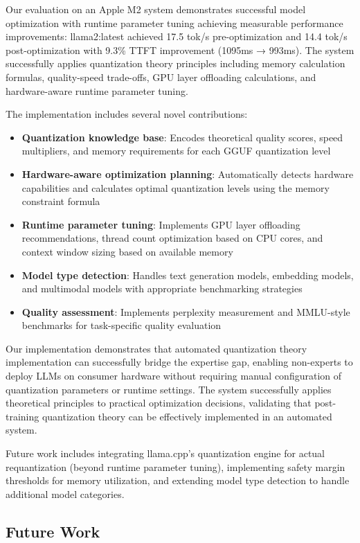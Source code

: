 \documentclass[journal]{IEEEtran}
\begin{document}
Our evaluation on an Apple M2 system demonstrates successful model optimization with runtime parameter tuning achieving measurable performance improvements: llama2:latest achieved 17.5 tok/s pre-optimization and 14.4 tok/s post-optimization with 9.3\% TTFT improvement (1095ms → 993ms). The system successfully applies quantization theory principles including memory calculation formulas, quality-speed trade-offs, GPU layer offloading calculations, and hardware-aware runtime parameter tuning.

The implementation includes several novel contributions:
\begin{itemize}
    \item \textbf{Quantization knowledge base}: Encodes theoretical quality scores, speed multipliers, and memory requirements for each GGUF quantization level
    \item \textbf{Hardware-aware optimization planning}: Automatically detects hardware capabilities and calculates optimal quantization levels using the memory constraint formula
    \item \textbf{Runtime parameter tuning}: Implements GPU layer offloading recommendations, thread count optimization based on CPU cores, and context window sizing based on available memory
    \item \textbf{Model type detection}: Handles text generation models, embedding models, and multimodal models with appropriate benchmarking strategies
    \item \textbf{Quality assessment}: Implements perplexity measurement and MMLU-style benchmarks for task-specific quality evaluation
\end{itemize}

Our implementation demonstrates that automated quantization theory implementation can successfully bridge the expertise gap, enabling non-experts to deploy LLMs on consumer hardware without requiring manual configuration of quantization parameters or runtime settings. The system successfully applies theoretical principles to practical optimization decisions, validating that post-training quantization theory can be effectively implemented in an automated system.

Future work includes integrating llama.cpp's quantization engine for actual requantization (beyond runtime parameter tuning), implementing safety margin thresholds for memory utilization, and extending model type detection to handle additional model categories.

\subsection{Future Work}
\end{document}
